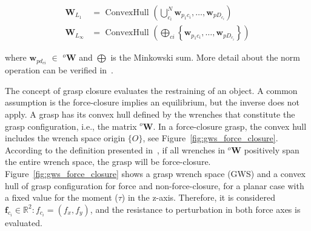 \begin{equation}
\begin{aligned}
\mathbf{W}_{L_{1}} &=\text { ConvexHull }\left(\bigcup_{c_i}^{N} \mathbf{w}_{p_1 c_i}, \ldots, \mathbf{w}_{p D_{c_i}}\right) \\
\mathbf{W}_{L_{\infty}} &=\text { ConvexHull }\left(\bigoplus_{c i}\left\{\mathbf{w}_{p_1 c_i}, \ldots, \mathbf{w}_{p D_{c_i}}\right\}\right)
\end{aligned}
\end{equation}

\noindent
where $\mathbf{w}_{pd_{ci}}$ $\in$ $^o\mathbf{W}$ and $\bigoplus$ is the Minkowski sum. More detail about the norm operation can be verified in~\cite{Ferrari}.


The concept of grasp closure evaluates the restraining of an object. A common assumption is the force-closure implies an equilibrium, but the inverse does not apply. A grasp has its convex hull defined by the wrenches that constitute the grasp configuration, i.e., the matrix $^{o} \mathbf{W}$. In a force-closure grasp, the convex hull includes the wrench space origin $\{O\}$, see Figure~\ref{fig:gws_force_closure}. According to the definition presented in~\cite{salisbury1983kinematic}, if all wrenches in $^{o} \mathbf{W}$ positively span the entire wrench space, the grasp will be force-closure. Figure~\ref{fig:gws_force_closure} shows a  grasp wrench space (GWS) and a convex hull of grasp configuration for force and non-force-closure, for a planar case with a fixed value for the moment ($\tau$) in the z-axis. Therefore, it is considered $\mathbf{f}_{c_i} \in  \mathbb{R}^2:  {f}_{c_i}  = (f_{x} , f_{y})$, and  the resistance to perturbation in both force axes is evaluated. 

\begin{figure}[h!]
\end{figure}

